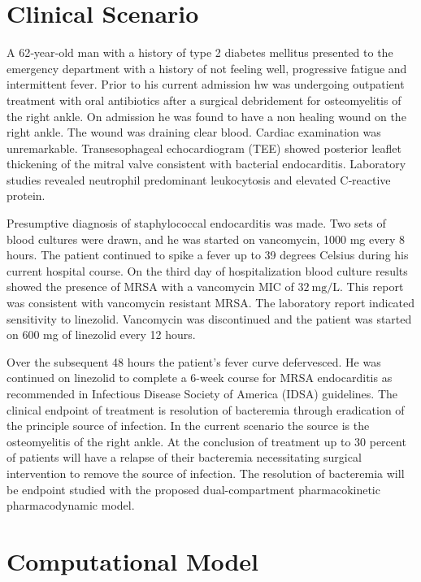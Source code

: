 \documentclass[12pt, draftcls, onecolumn]{IEEEtran}
\begin{document}
\section{Clinical Scenario}
A 62‑year‑old man with a history of type 2 diabetes mellitus presented to the emergency department with a history of not feeling well, progressive fatigue and intermittent fever. Prior to his current admission hw was undergoing outpatient treatment with oral antibiotics after a surgical debridement for osteomyelitis of the right ankle. On admission he was found to have a non healing wound on the right ankle.  The wound was draining clear blood. Cardiac examination was unremarkable.  Transesophageal echocardiogram (TEE) showed posterior leaflet thickening of the mitral valve consistent with bacterial endocarditis. Laboratory studies revealed neutrophil predominant leukocytosis and elevated C‑reactive protein.   

Presumptive diagnosis of staphylococcal endocarditis was made.  Two sets of blood cultures were drawn, and he was started on vancomycin, 1000 mg every 8 hours. The patient continued to spike a fever up to 39 degrees Celsius during his current hospital course.  On the third day of hospitalization blood culture results showed the presence of MRSA with a vancomycin MIC of $32~\mathrm{mg/L}$. This report was consistent with vancomycin resistant MRSA. The laboratory report indicated sensitivity to linezolid.  Vancomycin was discontinued and the patient was started on 600 mg of linezolid every 12 hours.

Over the subsequent 48 hours the patient's fever curve defervesced. He was continued on linezolid to complete a 6-week course for MRSA endocarditis as recommended in Infectious Disease Society of America (IDSA) guidelines.
The clinical endpoint of treatment is resolution of bacteremia through eradication of the principle source of infection.  In the current scenario the source is the osteomyelitis of the right ankle. At the conclusion of treatment up to 30 percent of patients will have a relapse of their bacteremia necessitating surgical intervention to remove the source of infection.  The resolution of bacteremia will be endpoint studied with the proposed dual-compartment pharmacokinetic pharmacodynamic model.



\maketitle
\section{Computational Model}
\end{document}
